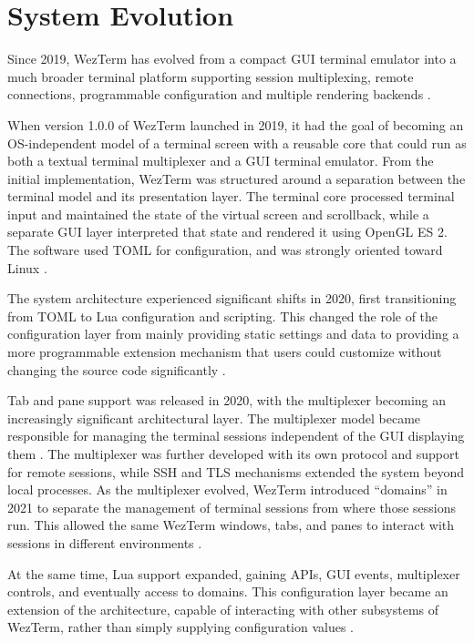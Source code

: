 \section{System Evolution}
\label{sec:evolution}

Since 2019, WezTerm has evolved from a compact GUI terminal emulator into a much broader terminal platform supporting session multiplexing, remote connections, programmable configuration and multiple rendering backends \cite{initial-readme}.

When version 1.0.0 of WezTerm launched in 2019, it had the goal of becoming an OS-independent model of a terminal screen with a reusable core that could run as both a textual terminal multiplexer and a GUI terminal emulator. From the  initial implementation, WezTerm was structured around a separation between the terminal model and its presentation layer. The terminal core processed terminal input and maintained the state of the virtual screen and scrollback, while a separate GUI layer interpreted that state and rendered it using OpenGL ES 2. The software used TOML for configuration, and was strongly oriented toward Linux \cite{initial-readme}.

The system architecture experienced significant shifts in 2020, first transitioning from TOML to Lua configuration and scripting. This changed the role of the configuration layer from mainly providing static settings and data to providing a more programmable extension mechanism that users could customize without changing the source code significantly \cite{changelog-2020-apr,changelog-2020-oct}.

Tab and pane support was released in 2020, with the multiplexer becoming an increasingly significant architectural layer. The multiplexer model became responsible for managing the terminal sessions independent of the GUI displaying them \cite{changelog-2020-oct,multiplexing}. The multiplexer was further developed with its own protocol and support for remote sessions, while SSH and TLS mechanisms extended the system beyond local processes. As the multiplexer evolved, WezTerm introduced “domains” in 2021 to separate the management of terminal sessions from where those sessions run. This allowed the same WezTerm windows, tabs, and panes to interact with sessions in different environments \cite{sshdomain,changelog-2022}.

At the same time, Lua support expanded, gaining APIs, GUI events, multiplexer controls, and eventually access to domains. This configuration layer became an extension of the architecture, capable of interacting with other subsystems of WezTerm, rather than simply supplying configuration values \cite{event-registration,mux-api}.

